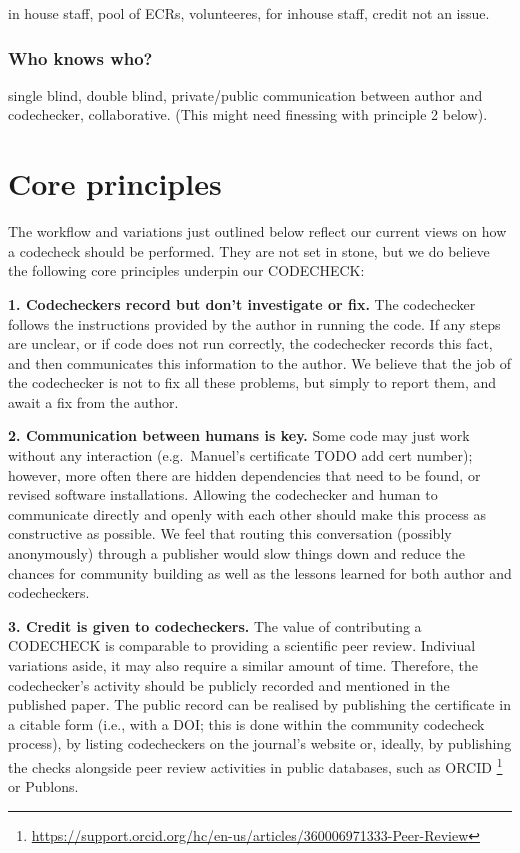 \documentclass[12pt]{article}
\begin{document}
in house staff, pool of ECRs, volunteeres, for inhouse staff, credit not
an issue.

\subsubsection*{Who knows who?}\label{who-knows-who}

single blind, double blind, private/public communication between author
and codechecker, collaborative. (This might need finessing with
principle 2 below).

\section*{Core principles}\label{core-principles}

The workflow and variations just outlined below reflect our current
views on how a codecheck should be performed. They are not set in
stone, but we do believe the following core principles underpin our
CODECHECK:

\textbf{1. Codecheckers record but don't investigate or fix.} The
codechecker follows the instructions provided by the author in running
the code. If any steps are unclear, or if code does not run correctly,
the codechecker records this fact, and then communicates this
information to the author. We believe that the job of the codechecker is
not to fix all these problems, but simply to report them, and await a
fix from the author.

\textbf{2. Communication between humans is key.} Some code may just work
without any interaction (e.g.~Manuel's certificate TODO add cert number); 
however, more often
there are hidden dependencies that need to be found, or revised software
installations. Allowing the codechecker and human to communicate
directly and openly with each other should make this process as
constructive as possible. We feel that routing this conversation
(possibly anonymously) through a publisher would slow things down and
reduce the chances for community building as well as the lessons learned
for both author and codecheckers.

\textbf{3. Credit is given to codecheckers.} The value of contributing a
CODECHECK is comparable to providing a scientific peer review. Indiviual
variations aside, it may also require a similar amount of time. Therefore,
the codechecker's activity should be publicly recorded and mentioned in the
published paper.
The public record can be realised by publishing the certificate in a 
citable form (i.e., with a DOI; this is done within the community codecheck
process), by listing codecheckers on the journal's website or, ideally, by
publishing the checks alongside peer review activities in public databases,
such as ORCID \footnote{\href{https://support.orcid.org/hc/en-us/articles/360006971333-Peer-Review}{https://support.orcid.org/hc/en-us/articles/360006971333-Peer-Review}}
or Publons.
\end{document}
